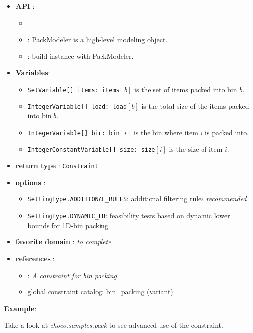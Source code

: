 \begin{itemize}
	\item \textbf{API} :
	\begin{itemize}
		\item {}
		\item {}: PackModeler is a high-level modeling object.
		\item {}: build instance with PackModeler.
	\end{itemize}
	\item \textbf{Variables}:
	\begin{itemize}
		\item \texttt{SetVariable[] items: items}$[b]$ is the set of items packed into bin $b$.
		\item \texttt{IntegerVariable[] load: load}$[b]$ is the total size of the items packed into bin $b$.
		\item \texttt{IntegerVariable[] bin: bin}$[i]$ is the bin where item $i$ is packed into.
		\item \texttt{IntegerConstantVariable[] size: size}$[i]$ is the size of item $i$.
	\end{itemize}
	\item \textbf{return type} : \texttt{Constraint}
	\item \textbf{options} : 	
      \begin{itemize}
      \item \texttt{SettingType.ADDITIONAL\_RULES}: additional filtering rules \emph{recommended}
      \item \texttt{SettingType.DYNAMIC\_LB}: feasibility tests based on dynamic lower bounds for 1D-bin packing
      \end{itemize}
	\item \textbf{favorite domain} : \emph{to complete}
	\item \textbf{references} :
      \begin{itemize}
      \item \cite{ShawCP04}: \emph{A constraint for bin packing}
      \item global constraint catalog: \href{http://www.emn.fr/x-info/sdemasse/gccat/Cbin_packing.html}{bin\_packing} (variant)
      \end{itemize}
\end{itemize}

\textbf{Example}:

Take a look at \emph{choco.samples.pack} to see advanced use of the constraint.


